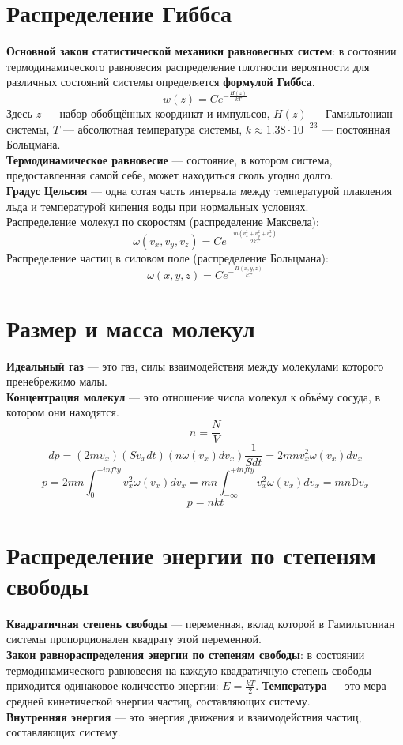 \documentclass[fleqn,a4paper,12pt,titlepage,finall]{article}
\begin{document}
\section{Распределение Гиббса}
{\bf Основной закон статистической механики равновесных систем}: в состоянии
термодинамического равновесия распределение плотности вероятности для различных
состояний системы определяется {\bf формулой Гиббса}.
\[w(z) = Ce^{-\frac{H(z)}{kT}}\]
Здесь $z$ --- набор обобщённых координат и импульсов, $H(z)$ --- Гамильтониан
системы, $T$ --- абсолютная температура системы, $k \approx 1.38\cdot10^{-23}$
--- постоянная Больцмана. \\
{\bf Термодинамическое равновесие} --- состояние, в котором система,
предоставленная самой себе, может находиться сколь угодно долго.\\
{\bf Градус Цельсия} --- одна сотая часть интервала между температурой плавления
льда и температурой кипения воды при нормальных условиях. \\
Распределение молекул по скоростям (распределение Максвела):
\[\omega(v_x, v_y, v_z) = Ce^{-\frac{m(v_x^2+v_y^2+v_z^2)}{2kT}}\]
Распределение частиц в силовом поле (распределение Больцмана):
\[\omega(x, y, z) = Ce^{-\frac{\Pi(x, y, z)}{kT}}\]

\section{Размер и масса молекул}
{\bf Идеальный газ} --- это газ, силы взаимодействия между молекулами которого
пренебрежимо малы. \\
{\bf Концентрация молекул} --- это отношение числа молекул к объёму сосуда, в
котором они находятся. \\
\[n = \frac{N}{V}\]
\[dp = (2mv_x)(Sv_xdt)(n\omega(v_x)dv_x)\frac{1}{Sdt} =
2mnv_x^2\omega(v_x)dv_x\]
\[p = 2mn\int_0^{+infty}v_x^2\omega(v_x)dv_x = mn\int_{-\infty}^{+infty}
v_x^2\omega(v_x)dv_x = mn\mathbb{D}v_x\]
\[\boxed{p=nkt}\]

\section{Распределение энергии по степеням свободы}
{\bf Квадратичная степень свободы} --- переменная, вклад которой в Гамильтониан
системы пропорционален квадрату этой переменной.\\
{\bf Закон равнораспределения энергии по степеням свободы}: в состоянии
термодинамического равновесия на каждую квадратичную степень свободы приходится
одинаковое количество энергии: $E = \frac{kT}{2}$.
{\bf Температура} --- это мера средней кинетической энергии частиц, составляющих
систему. \\
{\bf Внутренняя энергия} --- это энергия движения и взаимодействия частиц,
составляющих систему. \\
\end{document}
